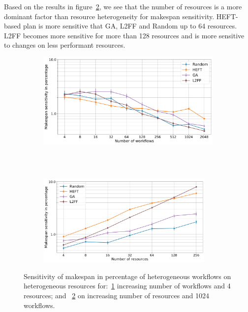 Based on the results in 
figure~\ref{fig:DyHeteroResources_StHeteroCampaignsSens}, we see that the 
number of resources is a more dominant factor than resource heterogeneity for 
makespan sensitivity. HEFT-based plan is more sensitive that GA, L2FF and 
Random up to 64 resources. L2FF becomes more sensitive for more than 128 
resources and is more sensitive to changes on less performant resources.

\begin{figure}[ht!]
    \centering
    \begin{subfigure}[b]{0.85\textwidth}
        \includegraphics[width=.95\textwidth]{figures/campaign/StHeteroCampaigns_4DynHeteroResourcesSens.pdf}
        \caption{}
        \label{fig:StHeteroCampaigns_4DyHeteroResourcesSens}
    \end{subfigure}\\
    ~ 
    \begin{subfigure}[b]{0.85\textwidth}
        \includegraphics[width=0.95\textwidth]{figures/campaign/DynHeteroResources_StHeteroCampaignsSens.pdf}
        \caption{}
        \label{fig:DyHeteroResources_StHeteroCampaignsSens}
    \end{subfigure}
    \caption{Sensitivity of makespan in percentage of heterogeneous workflows on heterogeneous resources for:~\ref{fig:StHeteroCampaigns_4DyHeteroResourcesSens}  increasing number of workflows and 4 resources; and
    ~\ref{fig:DyHeteroResources_StHeteroCampaignsSens} on increasing number of resources and 1024 workflows.}
    \label{fig:dyn_hetero_sens_analysis}
\end{figure}

